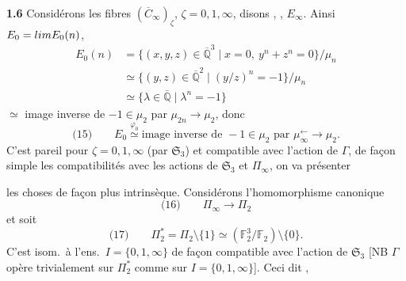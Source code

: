 \documentclass[11pt,a4paper]{article}
\begin{document}
\textbf{1.6} Considérons les fibres $(\overline{C}_\infty)_\zeta$, $\zeta = 0, 1, \infty$, disons , , $E_\infty$. Ainsi $E_0 = \varprojlim E_0(n)$,
\[
  \begin{aligned}
    E_0(n) &= \{(x, y, z) \in \overline{\mathbb{Q}}^{3} \mid x = 0,\ y^{n} + z^{n} = 0\}/\mu_n \\
    &\simeq \{(y, z) \in \overline{\mathbb{Q}}^{2} \mid (y/z)^{n} = -1\}/\mu_n \\
    &\simeq \{\lambda \in \overline{\mathbb{Q}} \mid \lambda^{n} = -1\}
  \end{aligned}
\]
$\simeq$  image inverse de $-1 \in \mu_2$ par $\mu_{2n} \to \mu_2$, donc
\[
  \text{(15)} \qquad E_0 \overset{\varphi_0}{\simeq} \text{image inverse de } -1 \in \mu_2 \text{ par } \mu^{\leftarrow}_{\infty} \to \mu_2 .
\]
C'est pareil pour $\zeta = 0, 1, \infty$ (par $\mathfrak{S}_3$) et compatible  avec l'action de \ill{} $\Gamma$, 
de façon simple les compatibilités avec les actions de $\mathfrak{S}_3$ et $\Pi_\infty$, on va présenter

les choses de façon plus intrinsèque. Considérons l'homomorphisme canonique
\[
  \text{(16)} \qquad \Pi_\infty \longrightarrow \Pi_2
\]
et soit
\[
  \text{(17)} \qquad \Pi_2^{*} = \Pi_2 \setminus \{1\} \simeq (\mathbb{F}_2^{3}/\mathbb{F}_2) \setminus \{0\} .
\]
C'est isom.\ à l'ens.\ $I = \{0, 1, \infty\}$ de façon compatible avec l'action de $\mathfrak{S}_3$ [NB $\Gamma$ opère trivialement sur $\Pi_2^{*}$ comme sur $I = \{0, 1, \infty\}$]. Ceci dit , 

\end{document}
